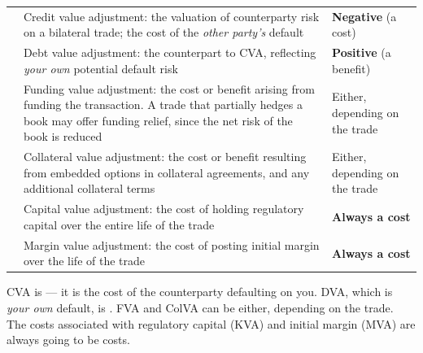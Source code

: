 \begin{center}
\footnotesize
\begin{tabular}{L{1.8cm} L{8.6cm} L{3.6cm}}
\toprule
{} &  &  \\
\midrule
{} & Credit value adjustment: the valuation of counterparty risk on a
  bilateral trade; the cost of the \emph{other party's} default &
  \textbf{Negative} (a cost) \\
 & Debt value adjustment: the counterpart to CVA, reflecting
  \emph{your own} potential default risk &
  \textbf{Positive} (a benefit) \\
 & Funding value adjustment: the cost or benefit arising from funding
  the transaction. A trade that partially hedges a book may offer funding relief,
  since the net risk of the book is reduced &
  Either, depending on the trade \\
 & Collateral value adjustment: the cost or benefit resulting from
  embedded options in collateral agreements, and any additional collateral terms &
  Either, depending on the trade \\
 & Capital value adjustment: the cost of holding regulatory capital over
  the entire life of the trade &
  \textbf{Always a cost} \\
 & Margin value adjustment: the cost of posting initial margin over the
  life of the trade &
  \textbf{Always a cost} \\
\bottomrule
\end{tabular}
\end{center}

\begin{crtrapbox}
CVA is  --- it is the cost of the counterparty defaulting on you.
DVA, which is \emph{your own} default, is . FVA and ColVA can be
either, depending on the trade. The costs associated with regulatory capital (KVA)
and initial margin (MVA) are always going to be costs.
\end{crtrapbox}
